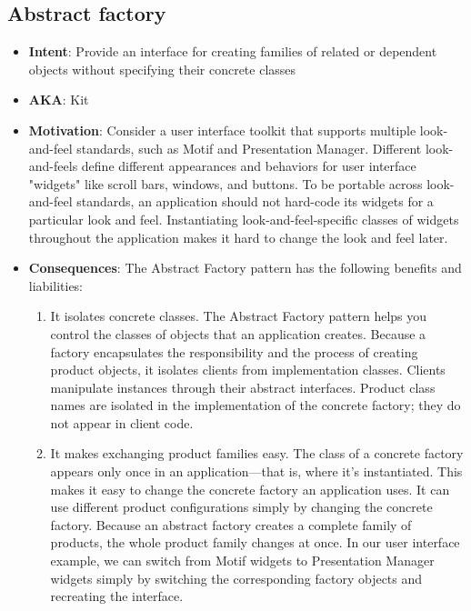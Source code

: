 \documentclass{report}
\begin{document}
        \subsection{Abstract factory}
        \begin{itemize}
            \item \textbf{Intent}: Provide an interface for creating families of related or dependent objects without specifying their concrete classes
            \item \textbf{AKA}: Kit
            \item \textbf{Motivation}:  Consider a user interface toolkit that supports multiple look-and-feel standards, such as Motif and Presentation Manager. Different look-and-feels define different appearances and behaviors for user interface "widgets" like scroll bars, windows, and buttons. To be portable across look-and-feel standards, an application should not hard-code its widgets for a particular look and feel. Instantiating look-and-feel-specific classes of widgets throughout the application makes it hard to change the look and feel later.
                \bigbreak \noindent
            \item \textbf{Consequences}: The Abstract Factory pattern has the following benefits and liabilities:
                \begin{enumerate}
                    \item It isolates concrete classes. The Abstract Factory pattern helps you control the classes of objects that an application creates. Because a factory encapsulates the responsibility and the process of creating product objects, it isolates clients from implementation classes. Clients manipulate instances through their abstract interfaces. Product class names are isolated in the implementation of the concrete factory; they do not appear in client code.
                    \item It makes exchanging product families easy. The class of a concrete factory appears only once in an application—that is, where it's instantiated. This makes it easy to change the concrete factory an application uses. It can use different product configurations simply by changing the concrete factory. Because an abstract factory creates a complete family of products, the whole product family changes at once. In our user interface example, we can switch from Motif widgets to Presentation Manager widgets simply by switching the corresponding factory objects and recreating the interface.

\end{enumerate}
\end{itemize}
\end{document}

